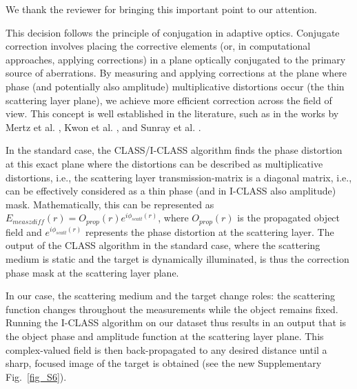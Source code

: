 \documentclass[12pt]{article}
\newcommand{\hlred}[1]{\sethlcolor{red!30}\hl{#1}}
\newenvironment{ourresponse}
    {\begin{tcolorbox}[width=\linewidth,breakable,enhanced,colback=gray!5,colframe=responsecolor!50,title=Response,left=5pt,right=5pt]}
    {\end{tcolorbox}}
\begin{document}
\begin{ourresponse}

    We thank the reviewer for bringing this important point to our attention.
    
    This decision follows the principle of conjugation in adaptive optics. Conjugate correction involves placing the corrective elements (or, in computational approaches, applying corrections) in a plane optically conjugated to the primary source of aberrations. By measuring and applying corrections at the plane where phase (and potentially also amplitude) multiplicative distortions occur (the thin scattering layer plane), we achieve more efficient correction across the field of view. This concept is well established in the literature, such as in the works by Mertz et al. \cite{mertz2015field}, Kwon et al. \cite{kwon2023computational}, and Sunray et al. \cite{sunray2024beyond}.
    
    In the standard case, the CLASS/I-CLASS algorithm finds the phase distortion at this exact plane where the distortions can be described as multiplicative distortions, i.e., the scattering layer transmission-matrix is a diagonal matrix, i.e., can be effectively considered as a thin phase (and in I-CLASS also amplitude) mask. Mathematically, this can be represented as $E_{meas zdiff}(r)=O_{prop}(r)e^{i\phi_{scatt}(r)}$, where $O_{prop}(r)$ is the propagated object field and $e^{i\phi_{scatt}(r)}$ represents the phase distortion at the scattering layer. The output of the CLASS algorithm in the standard case, where the scattering medium is static and the target is dynamically illuminated, is thus the correction phase mask at the scattering layer plane. 

    In our case, the scattering medium and the target change roles: the scattering function changes throughout the measurements while the object remains fixed. Running the I-CLASS algorithm on our dataset thus results in an output that is the object phase and amplitude function at the scattering layer plane. This complex-valued field is then back-propagated to any desired distance until a sharp, focused image of the target is obtained (see the new Supplementary Fig.~\ref{fig_S6}).


\end{ourresponse}
\end{document}
